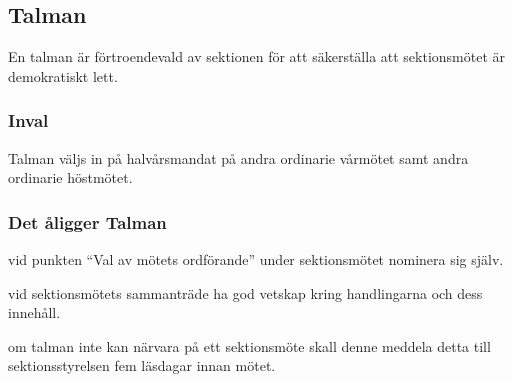 \subsection{Talman}
En talman är förtroendevald av sektionen för att säkerställa att sektionsmötet är demokratiskt lett. 

\subsubsection{Inval}
Talman väljs in på halvårsmandat på andra ordinarie vårmötet samt andra ordinarie höstmötet.
\subsubsection{Det åligger Talman}
\begin{att}
  \item vid punkten ``Val av mötets ordförande'' under sektionsmötet nominera sig själv.
  \item vid sektionsmötets sammanträde ha god vetskap kring handlingarna och dess innehåll.
  \item om talman inte kan närvara på ett sektionsmöte skall denne meddela detta till sektionsstyrelsen fem läsdagar innan mötet.
\end{att}